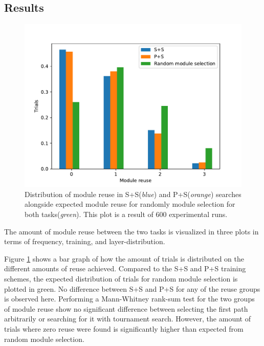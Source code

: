 \subsection{Results}
\label{exp1:BIN.results}
\begin{figure}[t]
    \includegraphics[width=\textwidth]{Chapters/4.Experiments/exp1/figures/BIN_module_reuse_bargraph.pdf}
    \caption[Module reuse for binary MNIST classification]{Distribution of module reuse in S+S(\textit{blue}) and P+S(\textit{orange}) searches alongside expected module reuse for randomly module selection for both tasks(\textit{green}). This plot is a result of 600 experimental runs.}
    \label{fig:binMNIST.hist}
\end{figure}

The amount of module reuse between the two tasks is visualized in three plots in terms of frequency, training, and layer-distribution.

Figure \ref{fig:binMNIST.hist} shows a bar graph of how the amount of trials is distributed on the different amounts of reuse achieved. Compared to the S+S and P+S training schemes, the expected distribution of trials for random module selection is plotted in green. No difference between S+S and P+S for any of the reuse groups is observed here. Performing a Mann-Whitney rank-sum test for the two groups of module reuse show no significant difference between selecting the first path arbitrarily or searching for it with tournament search.  However, the amount of trials where zero reuse were found is significantly higher than expected from random module selection.

